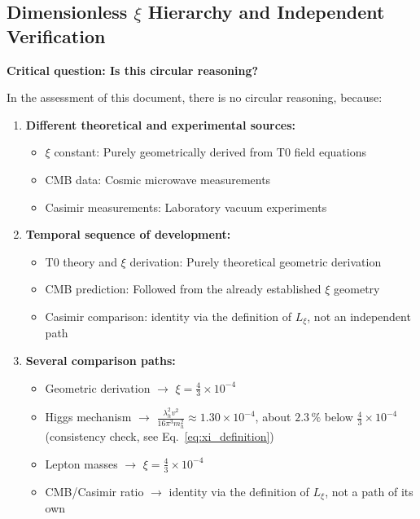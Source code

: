 	\subsection{Dimensionless $\xi$ Hierarchy and Independent Verification}
	
	\textbf{Critical question: Is this circular reasoning?}
	
	In the assessment of this document, there is no circular reasoning, because:
	
	\begin{enumerate}
		\item \textbf{Different theoretical and experimental sources:}
		\begin{itemize}
			\item $\xi$ constant: Purely geometrically derived from T0 field equations
			\item CMB data: Cosmic microwave measurements
			\item Casimir measurements: Laboratory vacuum experiments
		\end{itemize}
		
		\item \textbf{Temporal sequence of development:}
		\begin{itemize}
			\item T0 theory and $\xi$ derivation: Purely theoretical geometric derivation
			\item CMB prediction: Followed from the already established $\xi$ geometry
			\item Casimir comparison: identity via the definition of $L_\xi$, not an independent path
		\end{itemize}
		
		\item \textbf{Several comparison paths:}
		\begin{itemize}
			\item Geometric derivation $\to$ $\xi = \frac{4}{3} \times 10^{-4}$
			\item Higgs mechanism $\to$ $\frac{\lambda_h^2 v^2}{16\pi^3 m_h^2} \approx 1.30 \times 10^{-4}$, about $2.3\,\%$ below $\frac{4}{3} \times 10^{-4}$ (consistency check, see Eq.~\ref{eq:xi_definition})
			\item Lepton masses $\to$ $\xi = \frac{4}{3} \times 10^{-4}$
			\item CMB/Casimir ratio $\to$ identity via the definition of $L_\xi$, not a path of its own
		\end{itemize}
	\end{enumerate}
	
